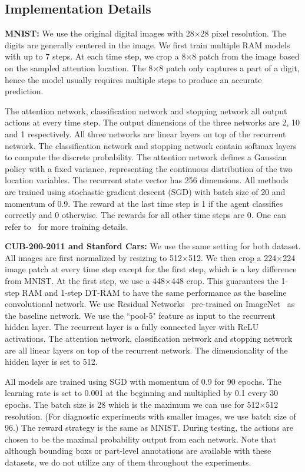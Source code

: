 \documentclass[10pt,twocolumn,letterpaper]{article}
\begin{document}
\subsection{Implementation Details}

{\bf MNIST:} We use the original digital images with 28$\times$28 pixel resolution.
The digits are generally centered in the image.
We first train multiple RAM models with up to 7 steps.
At each time step, we crop a 8$\times$8 patch from the image based on the sampled attention location.
The 8$\times$8 patch only captures a part of a digit, hence the model usually requires multiple steps to produce an accurate prediction.

The attention network, classification network and stopping network all output actions at every time step.
The output dimensions of the three networks are 2, 10 and 1 respectively.
All three networks are linear layers on top of the recurrent network.
The classification network and stopping network contain softmax layers to compute the discrete probability.
The attention network defines a Gaussian policy with a fixed variance, representing the continuous distribution of the two location variables.
The recurrent state vector has 256 dimensions.
All methods are trained using stochastic gradient descent (SGD) with batch size of 20 and momentum of 0.9.
The reward at the last time step is 1 if the agent classifies correctly and 0 otherwise.
The rewards for all other time steps are 0.
One can refer to~\cite{mnih2014recurrent} for more training details.

{\bf CUB-200-2011 and Stanford Cars:} We use the same setting for both dataset.
All images are first normalized by resizing to 512$\times$512.
We then crop a 224$\times$224 image patch at every time step except for the first step, which is a key difference from MNIST.
At the first step, we use a 448$\times$448 crop.
This guarantees the 1-step RAM and 1-step DT-RAM to have the same performance as the baseline convolutional network.
We use Residual Networks~\cite{he2016deep} pre-trained on ImageNet~\cite{deng2009imagenet} as the baseline network.
We use the ``pool-5" feature as input to the recurrent hidden layer.
The recurrent layer is a fully connected layer with ReLU activations.
The attention network, classification network and stopping network are all linear layers on top of the recurrent network.
The dimensionality of the hidden layer is set to 512.

All models are trained using SGD with momentum of 0.9 for 90 epochs.
The learning rate is set to 0.001 at the beginning and multiplied by 0.1 every 30 epochs.
The batch size is 28 which is the maximum we can use for 512$\times$512 resolution.
(For diagnostic experiments with smaller images, we use batch size of 96.)
The reward strategy is the same as MNIST.
During testing, the actions are chosen to be the maximal probability output from each network.
Note that although bounding boxs or part-level annotations are available with these datasets, we do not utilize any of them throughout the experiments.
\end{document}
